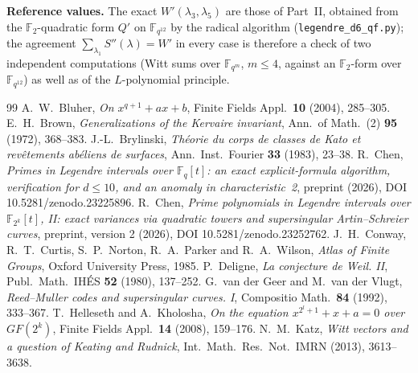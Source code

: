 ﻿\documentclass[12pt,a4paper]{amsart}
\theoremstyle{definition}
\newcommand{\F}{\mathbb{F}}
\newcommand{\Spp}{S''}
\begin{document}
\textbf{Reference values.} The exact $W'(\lambda_3,\lambda_5)$ are those of Part~II, obtained from the $\F_2$-quadratic form $Q'$ on $\F_{q^{12}}$ by the radical algorithm (\texttt{legendre\_d6\_qf.py}); the agreement $\sum_{\lambda_1}\Spp(\lambda)=W'$ in every case is therefore a check of two independent computations (Witt sums over $\F_{q^m}$, $m\le4$, against an $\F_2$-form over $\F_{q^{12}}$) as well as of the $L$-polynomial principle.

\clearpage
\begin{thebibliography}{99}
 A.~W.~Bluher, \emph{On $x^{q+1}+ax+b$}, Finite Fields Appl.\ \textbf{10} (2004), 285--305.
 E.~H.~Brown, \emph{Generalizations of the Kervaire invariant}, Ann.\ of Math.\ (2) \textbf{95} (1972), 368--383.
 J.-L.~Brylinski, \emph{Th\'eorie du corps de classes de Kato et rev\^etements ab\'eliens de surfaces}, Ann.\ Inst.\ Fourier \textbf{33} (1983), 23--38.
 R.~Chen, \emph{Primes in Legendre intervals over $\F_q[t]$: an exact explicit-formula algorithm, verification for $d\le10$, and an anomaly in characteristic~2}, preprint (2026), DOI 10.5281/zenodo.23225896.
 R.~Chen, \emph{Prime polynomials in Legendre intervals over $\F_{2^k}[t]$, II: exact variances via quadratic towers and supersingular Artin--Schreier curves}, preprint, version 2 (2026), DOI 10.5281/zenodo.23252762.
 J.~H.~Conway, R.~T.~Curtis, S.~P.~Norton, R.~A.~Parker and R.~A.~Wilson, \emph{Atlas of Finite Groups}, Oxford University Press, 1985.
 P.~Deligne, \emph{La conjecture de Weil. II}, Publ.\ Math.\ IH\'ES \textbf{52} (1980), 137--252.
 G.~van der Geer and M.~van der Vlugt, \emph{Reed--Muller codes and supersingular curves. I}, Compositio Math.\ \textbf{84} (1992), 333--367.
 T.~Helleseth and A.~Kholosha, \emph{On the equation $x^{2^l+1}+x+a=0$ over $GF(2^k)$}, Finite Fields Appl.\ \textbf{14} (2008), 159--176.
 N.~M.~Katz, \emph{Witt vectors and a question of Keating and Rudnick}, Int.\ Math.\ Res.\ Not.\ IMRN (2013), 3613--3638.
\end{thebibliography}
\end{document}
